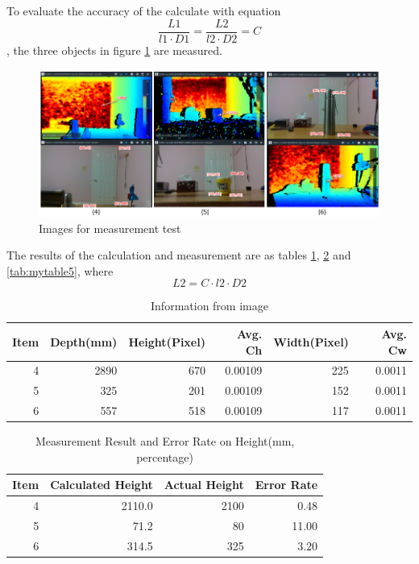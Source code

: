 \documentclass[
  oneside]{ubcthesis}
\begin{document}
To evaluate the accuracy of the calculate with equation \[\frac{L1}{l1 \cdot D1} = \frac{L2}{l2 \cdot D2} = C\], the three objects in figure \ref{fig:figure7} are measured.

\begin{figure}

{\centering \includegraphics[width=0.9\linewidth]{figures/7} 

}

\caption{Images for measurement test}\label{fig:figure7}
\end{figure}



The results of the calculation and measurement are as tables \ref{tab:mytable3}, \ref{tab:mytable4} and \ref{tab:mytable5}, where \[L2 = C \cdot l2 \cdot D2\]

\begin{table}

\caption{\label{tab:mytable3}Information from image}
\centering
\begin{tabular}[t]{rrrrrr}
\toprule
Item & Depth(mm) & Height(Pixel) & Avg. Ch & Width(Pixel) & Avg. Cw\\
\midrule
4 & 2890 & 670 & 0.00109 & 225 & 0.0011\\
5 & 325 & 201 & 0.00109 & 152 & 0.0011\\
6 & 557 & 518 & 0.00109 & 117 & 0.0011\\
\bottomrule
\end{tabular}
\end{table}

\begin{table}

\caption{\label{tab:mytable4}Measurement Result and Error Rate on Height(mm, percentage)}
\centering
\begin{tabular}[t]{rrrr}
\toprule
Item & Calculated Height & Actual Height & Error Rate\\
\midrule
4 & 2110.0 & 2100 & 0.48\\
5 & 71.2 & 80 & 11.00\\
6 & 314.5 & 325 & 3.20\\
\bottomrule
\end{tabular}
\end{table}
\end{document}
